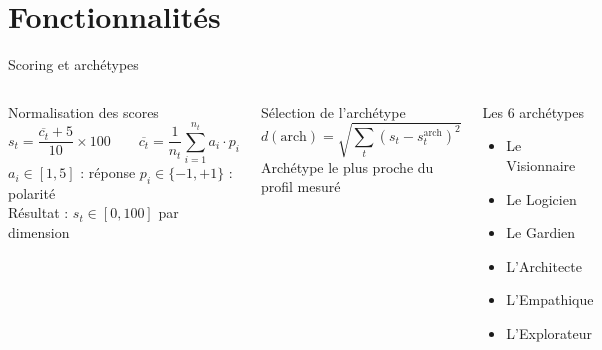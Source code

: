 \documentclass[aspectratio=169]{beamer}
\begin{document}
\section{Fonctionnalités}

\begin{frame}{Scoring et archétypes}

  \begin{columns}[T]
    \begin{block}{Normalisation des scores}
      \[
        s_t = \frac{\overline{c_t} + 5}{10} \times 100
        \qquad
        \overline{c_t} = \frac{1}{n_t}\sum_{i=1}^{n_t} a_i \cdot p_i
      \]
      \smallskip
      \small $a_i \in [1,5]$ : réponse \quad $p_i \in \{-1,+1\}$ : polarité\\
      Résultat : $s_t \in [0, 100]$ par dimension
    \end{block}

    \vspace{0.5em}
    \begin{block}{Sélection de l'archétype}
      \[
        d(\text{arch}) = \sqrt{\sum_{t}(s_t - s_t^{\text{arch}})^2}
      \]
      \small Archétype le plus proche du profil mesuré
    \end{block}

    \begin{exampleblock}{Les 6 archétypes}
      \begin{itemize}
        \item Le Visionnaire
        \item Le Logicien
        \item Le Gardien
        \item L'Architecte
        \item L'Empathique
        \item L'Explorateur
      \end{itemize}
    \end{exampleblock}
  \end{columns}

\end{frame}
\end{document}
